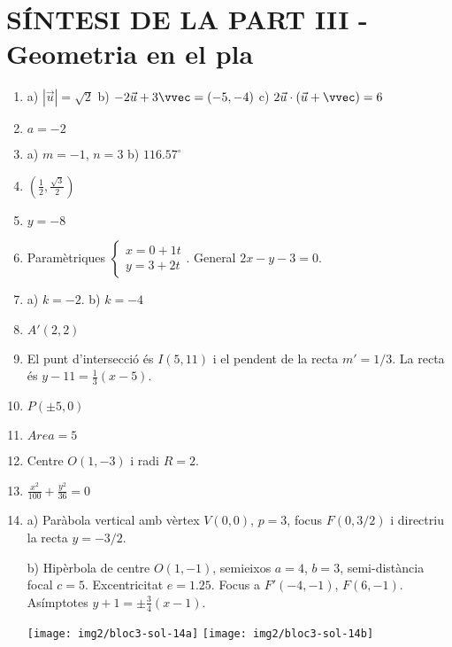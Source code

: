 \section*{SÍNTESI DE LA PART III - Geometria en el pla}
\begin{enumerate}
	
	\item a) $|\vec u|=\sqrt{2}$
  	  	 b) $-2\vec u + 3\vvec=(-5,-4)$
  		 c) $2\vec u \cdot (\vec u + \vvec)=6$
  		 
 	\item $a=-2$ 	
 	
 	\item a) $m=-1$, $n=3$   b) $116.57^\circ$
 	
 	\item $(\frac{1}{2}, \frac{\sqrt{3}}{2})$
 	
 	\item $y=-8$
 	
 	\item Paramètriques $\left\{\begin{array}{l} x=0+1t \\ y=3+2t \end{array}\right.$. General $2x-y-3=0$.
 	
 	\item a) $k=-2$.  b) $k=-4$
 	
 	\item $A'(2,2)$
 	
 	\item El punt d'intersecció és $I(5,11)$ i el pendent de la recta $m'=1/3$. La recta és $y-11=\frac{1}{3}(x-5)$.
 	
 	\item $P(\pm 5, 0)$
 	
 	\item $Area=5$
 	
 	\item  Centre $O(1,-3)$ i radi $R=2$.
 	
 	\item $\frac{x^2}{100}+\frac{y^2}{36}=0$
 	
 	\item 
 	 
 		a) Paràbola vertical amb vèrtex $V(0,0)$, $p=3$, focus $F(0,3/2)$ i directriu la recta $y=-3/2$.
 	
 		b) Hipèrbola de centre $O(1,-1)$, semieixos $a=4$, $b=3$, semi-distància focal $c=5$. Excentricitat $e=1.25$. Focus a $F'(-4,-1)$, $F(6,-1)$. Asímptotes $y+1=\pm\frac{3}{4}(x-1)$.

 		\begin{center}
 			\texttt{[image: img2/bloc3-sol-14a]}
 			\texttt{[image: img2/bloc3-sol-14b]}
 		\end{center}
  
\end{enumerate}



